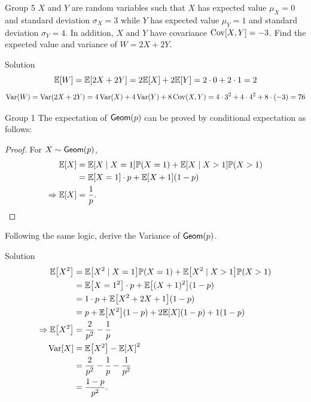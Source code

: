 \documentclass{article}
\begin{document}
\begin{problem}
    {Group 5}
    $X$ and $Y$ are random variables such that $X$ has expected value $\mu_X = 0$ and standard deviation $\sigma_X = 3$ while $Y$ has expected value $\mu_Y = 1$ and standard deviation $\sigma_Y = 4$. In addition, $X$ and $Y$ have covariance $\mathop{\mathrm{Cov}}\nolimits[X, Y] = -3$. Find the expected value and variance of $W = 2X+2Y$.
\end{problem}

\begin{solution}
    {Solution}
    \[
        \E{W} = \E{2X+2Y} = 2\E{X}+2\E{Y} = 2\cdot 0+2\cdot 1 = 2
    \]
    \[
        \mathop{\mathrm{Var}}\nolimits(W) = \mathop{\mathrm{Var}}\nolimits(2X+2Y) = 4\mathop{\mathrm{Var}}\nolimits(X)+4\mathop{\mathrm{Var}}\nolimits(Y)+8\mathop{\mathrm{Cov}}\nolimits(X,Y) = 4\cdot 3^2+4\cdot 4^2+8\cdot (-3) = 76
    \]
\end{solution}
\begin{problem}
    {Group 1}
    The expectation of $\mathsf{Geom}(p)$ can be proved by conditional expectation as follows:
    \begin{proof}
        For $X\sim\mathsf{Geom}(p)$,
        \begin{align*}
            \E{X}
            &= \condE{X}{X=1}\P{X=1}+\condE{X}{X>1}\P{X>1}\\
            &= \E{X=1}\cdot p + \E{X+1}(1-p)\\
            \Rightarrow
            \E{X} &= \frac{1}{p}.
        \end{align*}
    \end{proof}
    Following the same logic, derive the Variance of $\mathsf{Geom}(p)$.
\end{problem}

\begin{solution}
    {Solution}
    \begin{align*}
        \E{X^2}
        &= \condE{X^2}{X=1}\P{X=1}+\condE{X^2}{X>1}\P{X>1}\\
        &= \E{X=1^2}\cdot p + \E{(X+1)^2}(1-p)\\
        &= 1\cdot p + \E{X^2+2X+1}(1-p)\\
        &= p + \E{X^2}(1-p)+2\E{X}(1-p)+1(1-p)\\
        \Rightarrow
        \E{X^2}
        &= \frac{2}{p^2}-\frac{1}{p}\\
        \Var[X]
        &= \E{X^2}-\E{X}^2 \\
        &= \frac{2}{p^2}-\frac{1}{p}-\frac{1}{p^2} \\
        &= \frac{1-p}{p^2}.
    \end{align*}
\end{solution}
\end{document}
